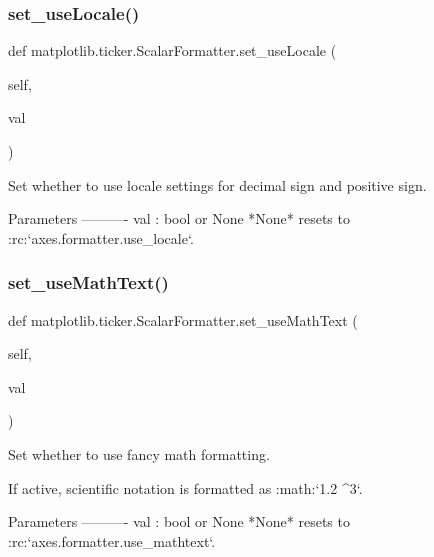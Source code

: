 \subsubsection{\texorpdfstring{set\+\_\+use\+Locale()}{set\_useLocale()}}
{\footnotesize\ttfamily def matplotlib.\+ticker.\+Scalar\+Formatter.\+set\+\_\+use\+Locale (\begin{DoxyParamCaption}\item[{}]{self,  }\item[{}]{val }\end{DoxyParamCaption})}

\begin{DoxyVerb}Set whether to use locale settings for decimal sign and positive sign.

Parameters
----------
val : bool or None
    *None* resets to :rc:`axes.formatter.use_locale`.
\end{DoxyVerb}
 \mbox{\label{classmatplotlib_1_1ticker_1_1ScalarFormatter_ac3a831d21e643c139e1bbaebb1027eb7}} 
\subsubsection{\texorpdfstring{set\+\_\+use\+Math\+Text()}{set\_useMathText()}}
{\footnotesize\ttfamily def matplotlib.\+ticker.\+Scalar\+Formatter.\+set\+\_\+use\+Math\+Text (\begin{DoxyParamCaption}\item[{}]{self,  }\item[{}]{val }\end{DoxyParamCaption})}

\begin{DoxyVerb}Set whether to use fancy math formatting.

If active, scientific notation is formatted as :math:`1.2 ^3`.

Parameters
----------
val : bool or None
    *None* resets to :rc:`axes.formatter.use_mathtext`.
\end{DoxyVerb}
 \mbox{\label{classmatplotlib_1_1ticker_1_1ScalarFormatter_aec6995dab1fd846023a6c48f88e88f9c}} 
